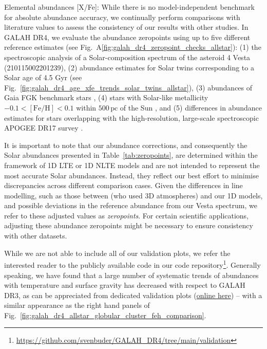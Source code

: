 \documentclass[
  journal=pasa,
  manuscript=research-paper, %
  year=2024,
  volume=37
]{cup-journal}
\begin{document}
Elemental abundances [X/Fe]: While there is no model-independent benchmark for absolute abundance accuracy, we continually perform comparisons with literature values to assess the consistency of our results with other studies. In GALAH DR4, we evaluate the abundance zeropoints using up to five different reference estimates (see Fig.~A\ref{fig:galah_dr4_zeropoint_checks_allstar}): (1) the spectroscopic analysis of a Solar-composition spectrum of the asteroid 4 Vesta (210115002201239), (2) abundance estimates for Solar twins corresponding to a Solar age of 4.5 Gyr (see Fig.~\ref{fig:galah_dr4_age_xfe_trends_solar_twins_allstar}), (3) abundances of Gaia FGK benchmark stars \citep{Jofre2015, Jofre2018}, (4) stars with Solar-like metallicity $-0.1 < \mathrm{[Fe/H]} < 0.1$ within $500\,\mathrm{pc}$ of the Sun \citep[a method introduced by][]{Joensson2020}, and (5) differences in abundance estimates for stars overlapping with the high-resolution, large-scale spectroscopic APOGEE DR17 survey \citep{SDSSDR17}. 

It is important to note that our abundance corrections, and consequently the Solar abundances presented in Table~\ref{tab:zeropoints}, are determined within the framework of 1D LTE or 1D NLTE models and are not intended to represent the most accurate Solar abundances. Instead, they reflect our best effort to minimise discrepancies across different comparison cases. Given the differences in line modelling, such as those between \citet{Grevesse2007} (who used 3D atmospheres) and our 1D models, and possible deviations in the reference abundance from our Vesta spectrum, we refer to these adjusted values as \textit{zeropoints}. For certain scientific applications, adjusting these abundance zeropoints might be necessary to ensure consistency with other datasets.

While we are not able to include all of our validation plots, we refer the interested reader to the publicly available code in our code repository\footnote{\url{https://github.com/svenbuder/GALAH_DR4/tree/main/validation}}. Generally speaking, we have found that a large number of systematic trends of abundances with temperature and surface gravity has decreased with respect to GALAH DR3, as can be appreciated from dedicated validation plots (\href{https://github.com/svenbuder/GALAH_DR4/blob/main/validation/galah_dr4_validation_globular_clusters.ipynb}{online here}) -- with a similar appearance as the right hand panels of Fig.~\ref{fig:galah_dr4_allstar_globular_cluster_feh_comparison}.
\end{document}
